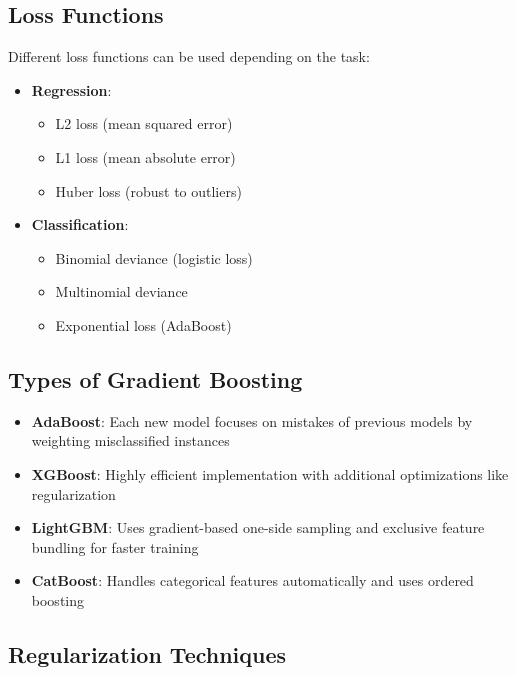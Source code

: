 \documentclass[
  letterpaper,
  DIV=11,
  numbers=noendperiod]{scrreprt}
\providecommand{\tightlist}{%
  \setlength{\itemsep}{0pt}\setlength{\parskip}{0pt}}\usepackage{longtable,booktabs,array}
\begin{document}
\subsection{Loss Functions}\label{loss-functions}

Different loss functions can be used depending on the task:

\begin{itemize}
\tightlist
\item
  \textbf{Regression}:

  \begin{itemize}
  \tightlist
  \item
    L2 loss (mean squared error)
  \item
    L1 loss (mean absolute error)
  \item
    Huber loss (robust to outliers)
  \end{itemize}
\item
  \textbf{Classification}:

  \begin{itemize}
  \tightlist
  \item
    Binomial deviance (logistic loss)
  \item
    Multinomial deviance
  \item
    Exponential loss (AdaBoost)
  \end{itemize}
\end{itemize}

\subsection{Types of Gradient
Boosting}\label{types-of-gradient-boosting}

\begin{itemize}
\tightlist
\item
  \textbf{AdaBoost}: Each new model focuses on mistakes of previous
  models by weighting misclassified instances
\item
  \textbf{XGBoost}: Highly efficient implementation with additional
  optimizations like regularization
\item
  \textbf{LightGBM}: Uses gradient-based one-side sampling and exclusive
  feature bundling for faster training
\item
  \textbf{CatBoost}: Handles categorical features automatically and uses
  ordered boosting
\end{itemize}

\subsection{Regularization Techniques}\label{regularization-techniques}
\end{document}
